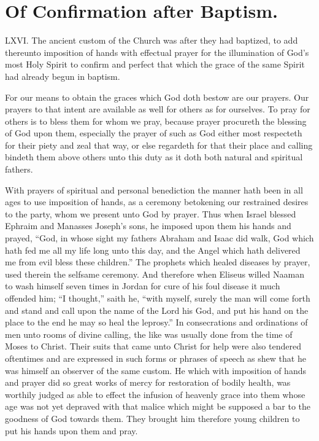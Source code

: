 \section*{Of Confirmation after Baptism.}
LXVI. The ancient custom of the Church was after they had baptized, to add thereunto imposition of hands with effectual prayer for the illumination of God’s most Holy Spirit to confirm and perfect that which the grace of the same Spirit had already begun in baptism.

For our means to obtain the graces which God doth bestow are our prayers. Our prayers to that intent are available as well for others as for ourselves. To pray for others is to bless them for whom we pray, because prayer procureth the blessing of God upon them, especially the prayer of such as God either most respecteth for their piety and zeal that way, or else regardeth for that their place and calling bindeth them above others unto this duty as it doth both natural and spiritual fathers.

With prayers of spiritual and personal benediction the manner hath been in all ages to use imposition of hands, as a ceremony betokening our restrained desires to the party, whom we present unto God by prayer. Thus when Israel blessed Ephraim and Manasses Joseph’s sons, he imposed upon them his hands and prayed, “God, in whose sight my fathers Abraham and Isaac did walk, God which hath fed me all my life long unto this day, and the Angel which hath delivered me from evil bless these children.” The prophets which healed diseases by prayer, used therein the selfsame ceremony. And therefore when Eliseus willed Naaman to  wash himself seven times in Jordan for cure of his foul disease it much offended him;
 “I thought,” saith he, “with myself, surely the man will come forth and stand and call upon the name of the Lord his God, and put his hand on the place to the end he may so heal the leprosy.” In consecrations and ordinations of men unto rooms of divine calling, the like was usually done from the time of Moses to Christ. Their suits that came unto Christ for help were also tendered oftentimes and are expressed in such forms or phrases of speech as shew that he was himself an observer of the same custom. He which with imposition of hands and prayer did so great works of mercy for restoration of bodily health, was worthily judged as able to effect the infusion of heavenly grace into them whose age was not yet depraved with that malice which might be supposed a bar to the goodness of God towards them. They brought him therefore young children to put his hands upon them and pray.

